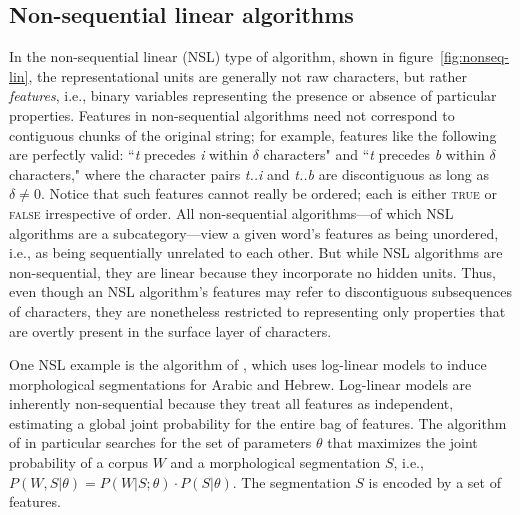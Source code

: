 {%

\subsection{Non-sequential linear algorithms}
\label{subsec:nonseq-lin}
In the non-sequential linear (NSL) type of algorithm, shown in figure~\ref{fig:nonseq-lin}, the representational units are generally not raw characters, but rather \emph{features}, i.e., binary variables representing the presence or absence of particular properties.
Features in non-sequential algorithms need not correspond to contiguous chunks of the original string; for example, features like the following are perfectly valid: ``\textit{t} precedes \textit{i} within $\delta$ characters" and ``\textit{t} precedes \textit{b} within $\delta$ characters," where the character pairs \emph{t..i} and \emph{t..b} are discontiguous as long as $\delta \ne 0$. Notice that such features cannot really be ordered; each is either \textsc{true} or \textsc{false} irrespective of order.
All non-sequential algorithms---of which NSL algorithms are a subcategory---view a given word's features as being unordered, i.e., as being sequentially unrelated to each other. 
But while NSL algorithms are non-sequential, they are linear because they incorporate no hidden units. Thus, even though an NSL algorithm's features may refer to discontiguous subsequences of characters, they are nonetheless restricted to representing only properties that are overtly present in the surface layer of characters. 

One NSL example is the algorithm of \cite{poon-et-al:2009}, which uses log-linear models to induce morphological segmentations for Arabic and Hebrew. 
Log-linear models are inherently non-sequential because they treat all features as independent, estimating a global joint probability for the entire bag of features. 
The algorithm of \cite{poon-et-al:2009} in particular searches for the set of parameters $\theta$ that maximizes the joint probability of a corpus $W$ and a morphological segmentation $S$, i.e., $P(W,S| \theta) = P(W|S; \theta) \cdot P(S| \theta)$. The segmentation $S$ is encoded by a set of features.

}
